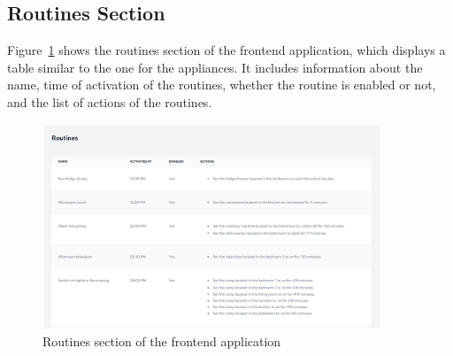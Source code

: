 \subsection{Routines Section}

Figure~\ref{fig:frontend_routines} shows the routines section of the frontend application, which displays a table similar to the one for the appliances. It includes information about the name, time of activation of the routines, whether the routine is enabled or not, and the list of actions of the routines.

\begin{figure}
    \centering
    \includegraphics[width=0.9\textwidth]{images/frontend/routines.png}
    \caption{Routines section of the frontend application}%
    \label{fig:frontend_routines}
\end{figure}